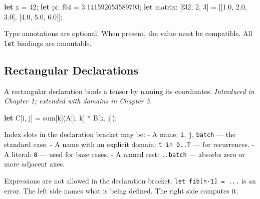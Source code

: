 \documentclass[11pt,titlepage]{article}
\newenvironment{Shaded}{}{}
\newcommand{\DataTypeTok}[1]{\textcolor[rgb]{0.56,0.13,0.00}{#1}}
\newcommand{\DecValTok}[1]{\textcolor[rgb]{0.25,0.63,0.44}{#1}}
\newcommand{\KeywordTok}[1]{\textcolor[rgb]{0.00,0.44,0.13}{\textbf{#1}}}
\newcommand{\NormalTok}[1]{#1}
\newcommand{\OperatorTok}[1]{\textcolor[rgb]{0.40,0.40,0.40}{#1}}
\begin{document}
\begin{Shaded}
\begin{Highlighting}[]
\KeywordTok{let}\NormalTok{ x = }\DecValTok{42}\NormalTok{;}
\KeywordTok{let}\NormalTok{ pi: }\DataTypeTok{f64}\NormalTok{ = }\DecValTok{3.141592653589793}\NormalTok{;}
\KeywordTok{let}\NormalTok{ matrix: }\OperatorTok{[}\DataTypeTok{f32}\NormalTok{; }\DecValTok{2}\NormalTok{, }\DecValTok{3}\OperatorTok{]}\NormalTok{ = }\OperatorTok{[[}\DecValTok{1.0}\NormalTok{, }\DecValTok{2.0}\NormalTok{, }\DecValTok{3.0}\OperatorTok{]}\NormalTok{, }\OperatorTok{[}\DecValTok{4.0}\NormalTok{, }\DecValTok{5.0}\NormalTok{, }\DecValTok{6.0}\OperatorTok{]]}\NormalTok{;}
\end{Highlighting}
\end{Shaded}

Type annotations are optional. When present, the value must be
compatible. All \texttt{let} bindings are immutable.

\vspace{2em}

\hypertarget{rectangular-declarations-1}{%
\subsection{Rectangular Declarations}\label{rectangular-declarations-1}}

A rectangular declaration binds a tensor by naming its coordinates.
\emph{Introduced in Chapter 1; extended with domains in Chapter 5.}

\begin{Shaded}
\begin{Highlighting}[]
\KeywordTok{let}\NormalTok{ C}\OperatorTok{[}\NormalTok{i, j}\OperatorTok{]}\NormalTok{ = sum}\OperatorTok{[}\NormalTok{k}\OperatorTok{]}\NormalTok{(A}\OperatorTok{[}\NormalTok{i, k}\OperatorTok{]}\NormalTok{ * B}\OperatorTok{[}\NormalTok{k, j}\OperatorTok{]}\NormalTok{);}
\end{Highlighting}
\end{Shaded}

Index slots in the declaration bracket may be: - A name: \texttt{i},
\texttt{j}, \texttt{batch} --- the standard case. - A name with an
explicit domain: \texttt{t\ in\ 0..T} --- for recurrences. - A literal:
\texttt{0} --- used for base cases. - A named rest: \texttt{..batch} ---
absorbs zero or more adjacent axes.

Expressions are not allowed in the declaration bracket.
\texttt{let\ fib{[}n-1{]}\ =\ ...} is an error. The left side names what
is being defined. The right side computes it.
\end{document}
